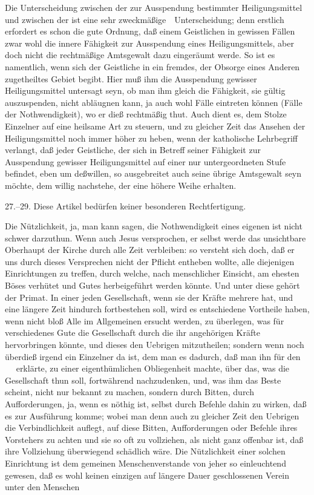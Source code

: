 \begin{aufza}
\item Die Unterscheidung zwischen der  zur Ausspendung bestimmter Heiligungsmittel und zwischen der  ist eine sehr zweckmäßige~\ Unterscheidung; denn erstlich erfordert es schon die gute Ordnung, daß einem Geistlichen in gewissen Fällen zwar wohl die innere Fähigkeit zur Ausspendung eines Heiligungsmittels, aber doch nicht die rechtmäßige Amtsgewalt dazu eingeräumt werde. So ist es namentlich, wenn sich der Geistliche in ein fremdes, der Obsorge eines Anderen zugetheiltes Gebiet begibt. Hier muß ihm die Ausspendung gewisser Heiligungsmittel untersagt seyn, ob man ihm gleich die Fähigkeit, sie gültig auszuspenden, nicht abläugnen kann, ja auch wohl Fälle eintreten können (Fälle der Nothwendigkeit), wo er dieß rechtmäßig thut. Auch dient es, dem Stolze Einzelner auf eine heilsame Art zu steuern, und zu gleicher Zeit das Ansehen der Heiligungsmittel noch immer höher zu heben, wenn der katholische Lehrbegriff verlangt, daß jeder Geistliche, der sich in Betreff seiner Fähigkeit zur Ausspendung gewisser Heiligungsmittel auf einer nur untergeordneten Stufe befindet, eben um deßwillen, so ausgebreitet auch seine übrige Amtsgewalt seyn möchte, dem willig nachstehe, der eine höhere Weihe erhalten.
\item[27.--29.]\setcounter{enumi}{29} Diese Artikel bedürfen keiner besonderen Rechtfertigung.
\item Die Nützlichkeit, ja, man kann sagen, die Nothwendigkeit eines eigenen  ist nicht schwer darzuthun. Wenn auch Jesus versprochen, er selbst werde das unsichtbare Oberhaupt der Kirche durch alle Zeit verbleiben: so versteht sich doch, daß er uns durch dieses Versprechen nicht der Pflicht entheben wollte, alle diejenigen Einrichtungen zu treffen, durch welche, nach menschlicher Einsicht, am ehesten Böses verhütet und Gutes herbeigeführt werden könnte. Und unter diese gehört der Primat. In einer jeden Gesellschaft, wenn sie der Kräfte mehrere hat, und eine längere Zeit hindurch fortbestehen soll, wird es entschiedene Vortheile haben, wenn nicht bloß Alle im Allgemeinen ersucht werden, zu überlegen, was für verschiedenes Gute die Gesellschaft durch die ihr angehörigen Kräfte hervorbringen könnte, und dieses den Uebrigen mitzutheilen; sondern wenn noch überdieß irgend ein Einzelner da ist, dem man es dadurch, daß man ihn für den ~\  erklärte, zu einer eigenthümlichen Obliegenheit machte, über das, was die Gesellschaft thun soll, fortwährend nachzudenken, und, was ihm das Beste scheint, nicht nur bekannt zu machen, sondern durch Bitten, durch Aufforderungen, ja, wenn es nöthig ist, selbst durch Befehle dahin zu wirken, daß es zur Ausführung komme; wobei man denn auch zu gleicher Zeit den Uebrigen die Verbindlichkeit auflegt, auf diese Bitten, Aufforderungen oder Befehle ihres Vorstehers zu achten und sie so oft zu vollziehen, als nicht ganz offenbar ist, daß ihre Vollziehung überwiegend schädlich wäre. Die Nützlichkeit einer solchen Einrichtung ist dem gemeinen Menschenverstande von jeher so einleuchtend gewesen, daß es wohl keinen einzigen auf längere Dauer geschlossenen Verein unter den Menschen\RWfootnote{%
}
\end{aufza}
